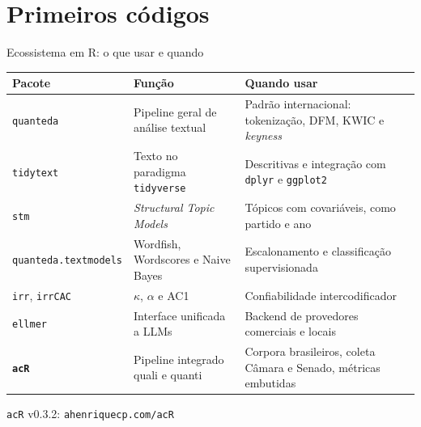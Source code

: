 \documentclass[11pt,aspectratio=169]{beamer}
\begin{document}
\section{Primeiros códigos}

\begin{frame}{Ecossistema em R: o que usar e quando}
\begin{table}
\scriptsize
\begin{tabular}{p{3.1cm}p{4.2cm}p{5.3cm}}
\toprule
\textbf{Pacote} & \textbf{Função} & \textbf{Quando usar} \\
\midrule
\texttt{quanteda} & Pipeline geral de análise textual & Padrão internacional:
tokenização, DFM, KWIC e \emph{keyness} \\
\addlinespace
\texttt{tidytext} & Texto no paradigma \texttt{tidyverse} & Descritivas e
integração com \texttt{dplyr} e \texttt{ggplot2} \\
\addlinespace
\texttt{stm} & \emph{Structural Topic Models} & Tópicos com covariáveis, como
partido e ano \\
\addlinespace
\texttt{quanteda.textmodels} & Wordfish, Wordscores e Naive Bayes &
Escalonamento e classificação supervisionada \\
\addlinespace
\texttt{irr}, \texttt{irrCAC} & $\kappa$, $\alpha$ e AC1 & Confiabilidade
intercodificador \\
\addlinespace
\texttt{ellmer} & Interface unificada a LLMs & Backend de provedores comerciais
e locais \\
\addlinespace
\textbf{\texttt{acR}} & Pipeline integrado quali e quanti & Corpora brasileiros,
coleta Câmara e Senado, métricas embutidas \\
\bottomrule
\end{tabular}
\end{table}
\vspace{0.05cm}
{\footnotesize \texttt{acR} v0.3.2: \texttt{ahenriquecp.com/acR}}
\end{frame}
\end{document}
